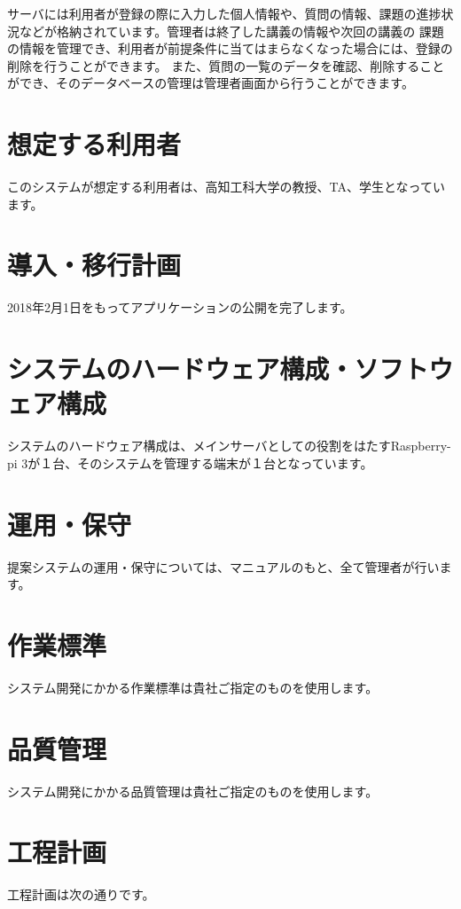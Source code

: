 \documentclass[a4j,titlepage]{ujarticle}
\begin{document}
サーバには利用者が登録の際に入力した個人情報や、質問の情報、課題の進捗状況などが格納されています。管理者は終了した講義の情報や次回の講義の %
課題の情報を管理でき、利用者が前提条件に当てはまらなくなった場合には、登録の削除を行うことができます。
また、質問の一覧のデータを確認、削除することができ、そのデータベースの管理は管理者画面から行うことができます。

\section{想定する利用者}
このシステムが想定する利用者は、高知工科大学の教授、TA、学生となっています。 %

\section{導入・移行計画}
2018年2月1日をもってアプリケーションの公開を完了します。

\section{システムのハードウェア構成・ソフトウェア構成}
システムのハードウェア構成は、メインサーバとしての役割をはたすRaspberry-pi 3が１台、そのシステムを管理する端末が１台となっています。 %

\section{運用・保守}
提案システムの運用・保守については、マニュアルのもと、全て管理者が行います。 %

\section{作業標準}
システム開発にかかる作業標準は貴社ご指定のものを使用します。

\section{品質管理}
システム開発にかかる品質管理は貴社ご指定のものを使用します。

\section{工程計画}
工程計画は次の通りです。
\end{document}
